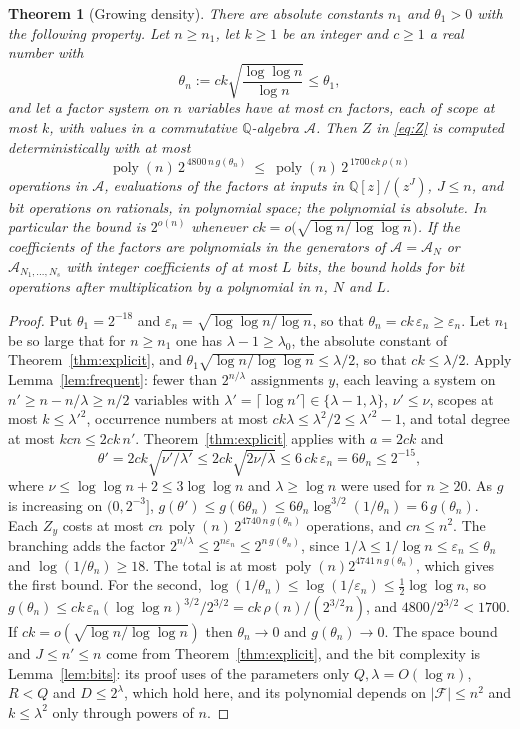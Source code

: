 \documentclass[11pt,reqno]{amsart}
\numberwithin{equation}{section}
\theoremstyle{plain}
\newtheorem{theorem}{Theorem}[section]
\theoremstyle{definition}
\theoremstyle{remark}
\DeclareMathOperator{\poly}{poly}
\newcommand{\A}{\mathcal{A}}
\newcommand{\F}{\mathcal{F}}
\newcommand{\Q}{\mathbb{Q}}
\newcommand{\rhon}{\rho}
\begin{document}
\begin{theorem}[Growing density]\label{thm:density}
There are absolute constants $n_1$ and $\theta_1>0$ with the following property.
Let $n\ge n_1$, let $k\ge1$ be an integer and $c\ge1$ a real number with
\[
  \theta_n:=ck\sqrt{\frac{\log\log n}{\log n}}\le\theta_1,
\]
and let a factor system on $n$ variables have at most $cn$ factors, each of scope
at most $k$, with values in a commutative $\Q$-algebra $\A$. Then $Z$ in
\eqref{eq:Z} is computed deterministically with at most
\[
  \poly(n)\,2^{\,4800\,n\,g(\theta_n)}\ \le\ \poly(n)\,2^{\,1700\,ck\,\rhon(n)}
\]
operations in $\A$, evaluations of the factors at inputs in $\Q[z]/(z^{J})$,
$J\le n$, and bit operations on rationals, in polynomial space; the polynomial is
absolute. In particular the bound is $2^{o(n)}$ whenever
$ck=o\bigl(\sqrt{\log n/\log\log n}\bigr)$. If the coefficients of the factors are
polynomials in the generators of $\A=\A_N$ or $\A_{N_1,\dots,N_s}$ with integer
coefficients of at most $L$ bits, the bound holds for bit operations after
multiplication by a polynomial in $n$, $N$ and $L$.
\end{theorem}

\begin{proof}
Put $\theta_1=2^{-18}$ and $\varepsilon_n=\sqrt{\log\log n/\log n}$, so that
$\theta_n=ck\,\varepsilon_n\ge\varepsilon_n$. Let $n_1$ be so large that for
$n\ge n_1$ one has $\lambda-1\ge\lambda_0$, the absolute constant of
Theorem~\ref{thm:explicit}, and $\theta_1\sqrt{\log n/\log\log n}\le\lambda/2$, so
that $ck\le\lambda/2$. Apply Lemma~\ref{lem:frequent}: fewer than $2^{n/\lambda}$
assignments $y$, each leaving a system on $n'\ge n-n/\lambda\ge n/2$ variables with
$\lambda'=\lceil\log n'\rceil\in\{\lambda-1,\lambda\}$, $\nu'\le\nu$, scopes at most
$k\le\lambda'^2$, occurrence numbers at most $ck\lambda\le\lambda^2/2\le\lambda'^2-1$,
and total degree at most $kcn\le2ck\,n'$. Theorem~\ref{thm:explicit} applies with
$a=2ck$ and
\[
  \theta'=2ck\sqrt{\nu'/\lambda'}\le2ck\sqrt{2\nu/\lambda}\le6\,ck\,\varepsilon_n=6\theta_n\le2^{-15},
\]
where $\nu\le\log\log n+2\le3\log\log n$ and $\lambda\ge\log n$ were used for $n\ge20$.
As $g$ is increasing on $(0,2^{-3}]$,
$g(\theta')\le g(6\theta_n)\le6\theta_n\log^{3/2}(1/\theta_n)=6\,g(\theta_n)$.
Each $Z_y$ costs at most $cn\,\poly(n)\,2^{4740\,n\,g(\theta_n)}$ operations, and
$cn\le n^2$. The branching adds the factor $2^{n/\lambda}\le2^{n\varepsilon_n}\le2^{n\,g(\theta_n)}$,
since $1/\lambda\le1/\log n\le\varepsilon_n\le\theta_n$ and $\log(1/\theta_n)\ge18$. The total is
at most $\poly(n)2^{4741\,n\,g(\theta_n)}$, which gives the first bound. For the second,
$\log(1/\theta_n)\le\log(1/\varepsilon_n)\le\frac12\log\log n$, so
$g(\theta_n)\le ck\,\varepsilon_n(\log\log n)^{3/2}/2^{3/2}=ck\,\rhon(n)/(2^{3/2}n)$,
and $4800/2^{3/2}<1700$. If $ck=o(\sqrt{\log n/\log\log n})$ then $\theta_n\to0$ and
$g(\theta_n)\to0$. The space bound and $J\le n'\le n$ come from
Theorem~\ref{thm:explicit}, and the bit complexity is Lemma~\ref{lem:bits}: its
proof uses of the parameters only $Q,\lambda=O(\log n)$, $R<Q$ and $D\le2^{\lambda}$,
which hold here, and its polynomial depends on $|\F|\le n^2$ and $k\le\lambda^2$ only
through powers of $n$.
\end{proof}
\end{document}
